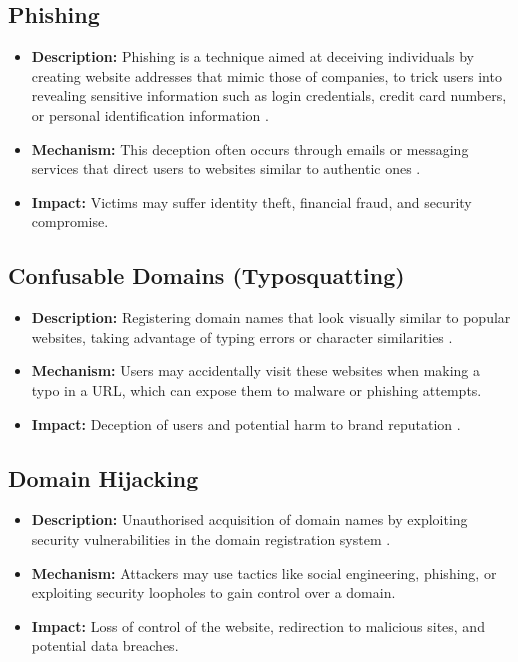 \subsection{Phishing}
\begin{itemize}
    \item \textbf{Description:} Phishing is a technique aimed at deceiving individuals by creating website addresses that mimic those of companies, to trick users into revealing sensitive information such as login credentials, credit card numbers, or personal identification information \cite{webinarcare2023dnsstats}.
    \item \textbf{Mechanism:} This deception often occurs through emails or messaging services that direct users to websites similar to authentic ones \cite{jakobsson2006phishing}.
    \item \textbf{Impact:} Victims may suffer identity theft, financial fraud, and security compromise.
\end{itemize}

\subsection{Confusable Domains (Typosquatting)}
\begin{itemize}
    \item \textbf{Description:} Registering domain names that look visually similar to popular websites, taking advantage of typing errors or character similarities \cite{inta2023dnstypo}.
    \item \textbf{Mechanism:} Users may accidentally visit these websites when making a typo in a URL, which can expose them to malware or phishing attempts.
    \item \textbf{Impact:} Deception of users and potential harm to brand reputation \cite{edelman2008typosquatting}.
\end{itemize}

\subsection{Domain Hijacking}
\begin{itemize}
    \item \textbf{Description:} Unauthorised acquisition of domain names by exploiting security vulnerabilities in the domain registration system \cite{inta2023dnstypo}.
    \item \textbf{Mechanism:} Attackers may use tactics like social engineering, phishing, or exploiting security loopholes to gain control over a domain.
    \item \textbf{Impact:} Loss of control of the website, redirection to malicious sites, and potential data breaches.
\end{itemize}

